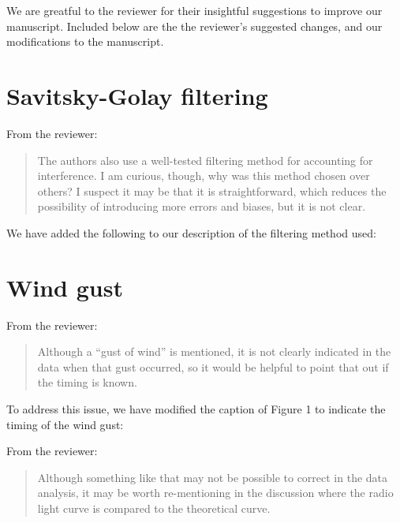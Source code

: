 \documentclass{article}
\begin{document}
We are greatful to the reviewer for their insightful suggestions to improve our manuscript.
Included below are the the reviewer's suggested changes, and our modifications to the manuscript.

\section{Savitsky-Golay filtering}

From the reviewer:

\begin{quote}
The authors also use a well-tested filtering method for accounting for interference.
I am curious, though, why was this method chosen over others? I suspect it may be that it is straightforward, which reduces the possibility of introducing more errors and biases, but it is not clear.
\end{quote}
\noindent We have added the following to our description of the filtering method used:

\begin{quote}
  
\end{quote}



\section{Wind gust}

From the reviewer:

\begin{quote}
  Although a ``gust of wind'' is mentioned, it is not clearly indicated in the data when that gust occurred, so it would be helpful to point that out if the timing is known.
\end{quote}

\noindent To address this issue, we have modified the caption of Figure 1 to indicate the timing of the wind gust:

\begin{quote}
  
\end{quote}

\noindent From the reviewer:

\begin{quote}
  Although something like that may not be possible to correct in the data analysis, it may be worth re-mentioning in the discussion where the radio light curve is compared to the theoretical curve.
\end{quote}
\end{document}
